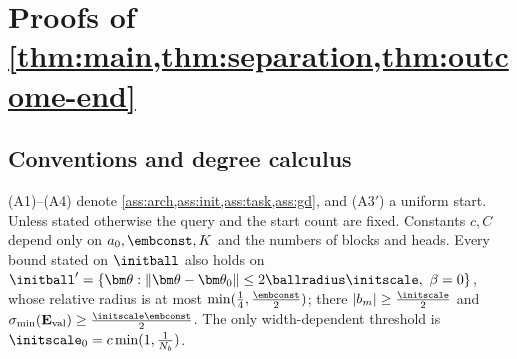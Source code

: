 \section{Proofs of \texorpdfstring{\cref{thm:main,thm:separation,thm:outcome-end}}{Theorems 1-3}}
\label{app:damping-proof}
\label{app:mainproofs}

\subsection{Conventions and degree calculus}
\label{app:assumptions}

\begin{table}[h]
\caption{Lemmas of \cref{app:mainproofs} and the theorems they feed.}
\label{tab:C-map}
\centering\small
{}
\end{table}


(A1)--(A4) denote \cref{ass:arch,ass:init,ass:task,ass:gd}, and (A3$'$) a uniform start. Unless stated otherwise the query and the start
count are fixed. Constants $c,C$ depend only on $a_0,\embconst,K$ and the numbers of blocks and heads. Every bound stated on $\initball$ also
holds on $\initball'=\{\bm\theta:\|\bm\theta-\bm\theta_0\|\le2\ballradius\initscale,\ \beta=0\}$, whose relative radius is at most $\min(\frac{1}{4},\frac{\embconst}{2})$; there
$|b_m|\ge\frac{\initscale}{2}$ and $\sigma_{\min}(\mathbf E_{\mathrm{val}})\ge\frac{\initscale\embconst}{2}$. The only width-dependent threshold is $\initscale_0=c\min(1,\frac{1}{N_b})$.

